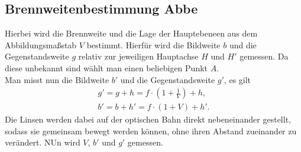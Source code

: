 \subsection{Brennweitenbestimmung Abbe}
Hierbei wird die Brennweite und die Lage der Hauptebeneen aus dem Abbildungsmaßstab $V$ bestimmt.
Hierfür wird die Bildweite $b$ und die Gegenstandsweite $g$ relativ zur jeweiligen Hauptachse $H$ und $H'$ gemessen.
Da diese unbekannt sind wählt man einen beliebigen Punkt $A$.\\
Man misst nun die Bildweite $b'$ und die Gegenstandsweite $g'$, es gilt
\begin{align}
    g'=g+h=f \cdot \left(1+\frac{1}{V}\right)+h,\\
    b'=b+h'=f \cdot \left(1+V\right)+h'.
\end{align}
Die Linsen werden dabei auf der optischen Bahn direkt nebeneinander gestellt, sodass sie gemeinsam bewegt werden können,
ohne ihren Abstand zueinander zu verändert. NUn wird $V$, $b'$ und $g'$ gemessen.
